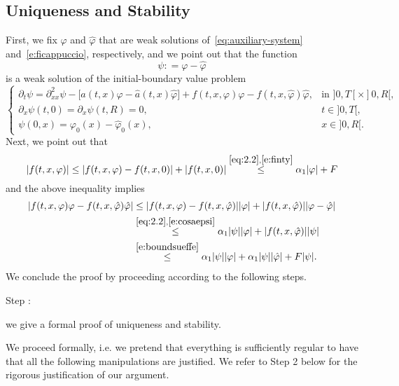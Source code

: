 \documentclass[11pt,leqno]{amsart}
\newcounter{stepnb}
\numberwithin{equation}{section}
\begin{document}
\subsection{Uniqueness and Stability}
\label{sss:uni}
First, we fix ${\varphi}$ and $\hat {\varphi}$ that are weak solutions of~\eqref{eq:auxiliary-system} and~\eqref{e:ficappuccio}, respectively, and we point out that the function 
\begin{equation}
\label{e:cosaepsi}
    \psi : = {\varphi} - \hat {\varphi}
\end{equation}
is a weak solution of the initial-boundary value problem
\begin{equation}
\label{e:fhimenohfhi}
\begin{cases}
{\partial_t} \psi =  {\partial_{xx}^2} \psi - \big[ a (t, x) {\varphi}- \hat a (t, x) 
       \hat {\varphi} \big] + f(t, x, {\varphi}) {\varphi}- f(t, x, \hat {\varphi}) \hat
{\varphi}, & \text{in $]0, T[ \times ]0, R[$} ,  \\
{\partial_x } \psi(t,0)={\partial_x } \psi(t,R) = 0, & t \in ]0, T[, \\
\psi (0,x) = {\varphi}_0 (x)- \hat {\varphi}_0(x), & x \in {]0,R[}.
\end{cases}
\end{equation}
Next, we point out that
\begin{equation}
\label{e:boundsueffe}
  |f(t, x, {\varphi}) |
  \leq |f(t, x, {\varphi}) - f(t, x , 0)| +
  |f(t, x, 0)|
  \stackrel{\eqref{eq:2.2},\eqref{e:finty}}{\leq}
   \alpha_1 |{\varphi}| +F 
     
      
\end{equation}
and the above inequality implies
\begin{equation}
\label{e:effeinintegrale}
\begin{split}
      |f(t, x, {\varphi}) {\varphi}- f(t, x, \hat {\varphi}) \hat {\varphi} |
      & 
      \leq |f(t, x, {\varphi}) - f(t, x, \hat {\varphi}) | | {\varphi}| +
      | f(t, x, \hat {\varphi}) | |{\varphi} - \hat {\varphi}| \\
      & \stackrel{\eqref{eq:2.2},\eqref{e:cosaepsi}}{\leq}
      \alpha_1 |\psi| |{\varphi}| +  | f(t, x, \hat {\varphi}) | |\psi| \\
      & \stackrel{\eqref{e:boundsueffe}}{\leq}
      \alpha_1 |\psi| |{\varphi}| + \alpha_1 |\psi| |\hat {\varphi}| 
      + F |\psi|. \\
\end{split}      
\end{equation}
We conclude the proof by proceeding according to the following steps. \\
{\setcounter{stepnb}{0}}
{{{\sc \addtocounter{stepnb}{1}\noindent  Step :} {we give a formal proof of uniqueness and stability}.}} We proceed formally, i.e. we pretend that everything is sufficiently regular to have that all the following manipulations are justified. We refer to {\sc Step 2} below for the rigorous justification of our argument. 
\end{document}
